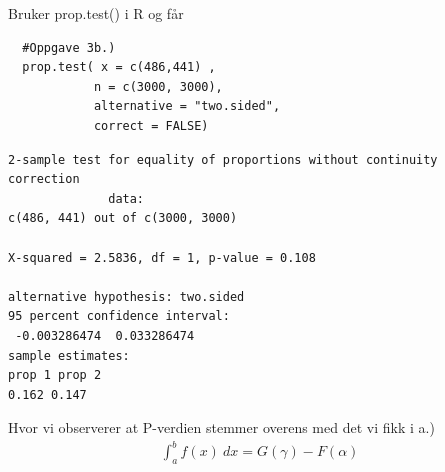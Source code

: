 \documentclass[12pt,
               a4paper,
               article,
               oneside,
               oldfontcommands,
               norsk]{memoir}
\begin{document}
Bruker prop.test() i R og får 
\begin{lstlisting}
  #Oppgave 3b.)
  prop.test( x = c(486,441) , 
            n = c(3000, 3000), 
            alternative = "two.sided", 
            correct = FALSE)
\end{lstlisting}
\begin{verbatim} 
2-sample test for equality of proportions without continuity correction
              data:  
c(486, 441) out of c(3000, 3000)

X-squared = 2.5836, df = 1, p-value = 0.108

alternative hypothesis: two.sided
95 percent confidence interval:
 -0.003286474  0.033286474
sample estimates:
prop 1 prop 2
0.162 0.147
\end{verbatim}
Hvor vi observerer at P-verdien stemmer overens med det vi fikk i a.) 
\begin{align*}
  \int_{a}^{b} f(x) \ dx = G(\gamma) - F(\alpha)
\end{align*}
\end{document}
